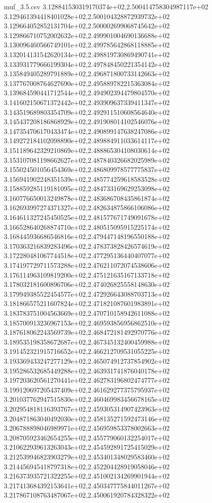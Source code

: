 \begin{filecontents*}{muf_3.5.csv}
3.128841530319170374e+02,2.500414758304987117e+02
3.129461394418401028e+02,2.500104328872939732e+02
3.129664052852131704e+02,2.500002699068745642e+02
3.129866710752002632e+02,2.499901004690136688e+02
3.130096460566749101e+02,2.499785642868118885e+02
3.132014131542620134e+02,2.498819730869490741e+02
3.133931779666199304e+02,2.497848450221354142e+02
3.135849405289791889e+02,2.496871800733142663e+02
3.137767008764627690e+02,2.495889782215363084e+02
3.139684590441712544e+02,2.494902394479804570e+02
3.141602150671372442e+02,2.493909637339411347e+02
3.143519689803354709e+02,2.492911510608564640e+02
3.145437208186868929e+02,2.491908014102546076e+02
3.147354706170433474e+02,2.490899147638247086e+02
3.149272184102098890e+02,2.489884911033614117e+02
3.151189642329210869e+02,2.488865304108030614e+02
3.153107081198662627e+02,2.487840326682025989e+02
3.155024501056454369e+02,2.486809978577775837e+02
3.156941902248351539e+02,2.485774259618583528e+02
3.158859285119181095e+02,2.484733169629253098e+02
3.160776650013249878e+02,2.483686708435861874e+02
3.162693997274371327e+02,2.482634875866106086e+02
3.164611327245450525e+02,2.481577671749091678e+02
3.166528640268874710e+02,2.480515095915225174e+02
3.168445936686546816e+02,2.479447148196550188e+02
3.170363216839283496e+02,2.478373828426574619e+02
3.172280481067744518e+02,2.477295136440407077e+02
3.174197729711573288e+02,2.476211072074538606e+02
3.176114963109819200e+02,2.475121635167133718e+02
3.178032181600896706e+02,2.474026825558148630e+02
3.179949385522454577e+02,2.472926643088703713e+02
3.181866575211607824e+02,2.471821087601983891e+02
3.183783751004563669e+02,2.470710158942611088e+02
3.185700913236967153e+02,2.469593856956862510e+02
3.187618062243569739e+02,2.468472181492970776e+02
3.189535198358672687e+02,2.467345132400459988e+02
3.191452321915716652e+02,2.466212709531055225e+02
3.193369433247277129e+02,2.465074912737854902e+02
3.195286532685449288e+02,2.463931741876040178e+02
3.197203620561270441e+02,2.462783196802474777e+02
3.199120697205437409e+02,2.461629277375795937e+02
3.201037762947515830e+02,2.460469983456678165e+02
3.202954818116393767e+02,2.459305314907423963e+02
3.204871863040492030e+02,2.458135271592473146e+02
3.206788898046989971e+02,2.456959853378002663e+02
3.208705923462654255e+02,2.455779060132254017e+02
3.210622939613263043e+02,2.454592891725415029e+02
3.212539946823903279e+02,2.453401348029583460e+02
3.214456945418797318e+02,2.452204428919058046e+02
3.216373935721322255e+02,2.451002134269901944e+02
3.217413684392153641e+02,2.450347775844011267e+02
3.217867108763487067e+02,2.450061920784328322e+02

\end{filecontents*}
